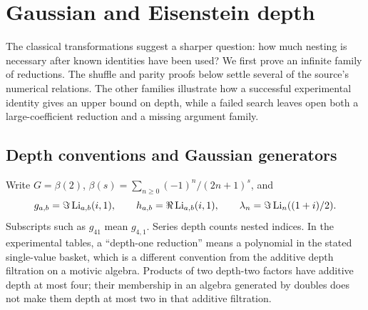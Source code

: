 \chapter{Gaussian and Eisenstein depth}\label{ch:04-depth}
The classical transformations suggest a sharper question: how much nesting
is necessary after known identities have been used? We first prove an
infinite family of reductions. The shuffle and parity proofs below settle several of the source's numerical
relations. The other families illustrate how a successful
experimental identity gives an upper bound on depth, while a failed search
leaves open both a large-coefficient reduction and a missing argument family.

\section{Depth conventions and Gaussian generators}
Write $G=\beta(2)$, $\beta(s)=\sum_{n\ge0}(-1)^n/(2n+1)^s$, and
\[
g_{a,b}=\Im\operatorname{Li}_{a,b}(i,1),\qquad h_{a,b}=\Re\operatorname{Li}_{a,b}(i,1),\qquad
\lambda_n=\Im\operatorname{Li}_n((1+i)/2).
\]
Subscripts such as $g_{41}$ mean $g_{4,1}$.
Series depth counts nested indices. In the experimental tables, a
``depth-one reduction'' means a polynomial in the stated single-value
basket, which is a different convention from the additive depth filtration
on a motivic algebra. Products of two depth-two factors have additive depth
at most four; their membership in an algebra generated by doubles does not
make them depth at most two in that additive filtration.

